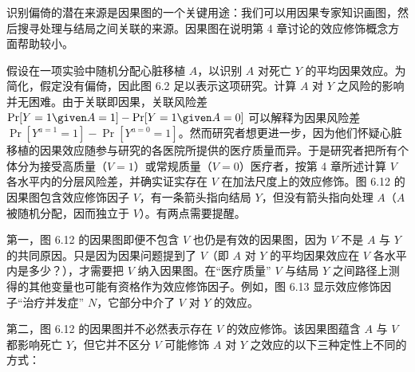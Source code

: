 识别偏倚的潜在来源是因果图的一个关键用途：我们可以用因果专家知识画图，然后搜寻处理与结局之间关联的来源。因果图在说明第 4 章讨论的效应修饰概念方面帮助较小。


假设在一项实验中随机分配心脏移植 $A$，以识别 $A$ 对死亡 $Y$ 的平均因果效应。为简化，假定没有偏倚，因此图 6.2 足以表示这项研究。计算 $A$ 对 $Y$ 之风险的影响并无困难。由于关联即因果，关联风险差 $\Pr[Y=1\given A=1]-\Pr[Y=1\given A=0]$ 可以解释为因果风险差 $\Pr[Y^{a=1}=1]-\Pr[Y^{a=0}=1]$。然而研究者想更进一步，因为他们怀疑心脏移植的因果效应随参与研究的各医院所提供的医疗质量而异。于是研究者把所有个体分为接受高质量（$V=1$）或常规质量（$V=0$）医疗者，按第 4 章所述计算 $V$ 各水平内的分层风险差，并确实证实存在 $V$ 在加法尺度上的效应修饰。图 6.12 的因果图包含效应修饰因子 $V$，有一条箭头指向结局 $Y$，但没有箭头指向处理 $A$（$A$ 被随机分配，因而独立于 $V$）。有两点需要提醒。

\begin{figure}[htbp]
\centering
{}
\caption{}
\label{fig:6.12}
\end{figure}

第一，图 6.12 的因果图即便不包含 $V$ 也仍是有效的因果图，因为 $V$ 不是 $A$ 与 $Y$ 的共同原因。只是因为因果问题提到了 $V$（即 $A$ 对 $Y$ 的平均因果效应在 $V$ 各水平内是多少？），才需要把 $V$ 纳入因果图。在“医疗质量” $V$ 与结局 $Y$ 之间路径上测得的其他变量也可能有资格作为效应修饰因子。例如，图 6.13 显示效应修饰因子“治疗并发症” $N$，它部分中介了 $V$ 对 $Y$ 的效应。

\begin{figure}[htbp]
\centering
{}
\caption{}
\label{fig:6.13}
\end{figure}

第二，图 6.12 的因果图并不必然表示存在 $V$ 的效应修饰。该因果图蕴含 $A$ 与 $V$ 都影响死亡 $Y$，但它并不区分 $V$ 可能修饰 $A$ 对 $Y$ 之效应的以下三种定性上不同的方式：

